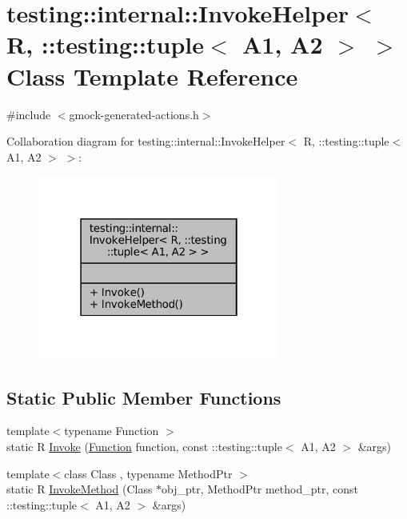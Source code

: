 \hypertarget{classtesting_1_1internal_1_1InvokeHelper_3_01R_00_01_1_1testing_1_1tuple_3_01A1_00_01A2_01_4_01_4}{}\section{testing\+:\+:internal\+:\+:Invoke\+Helper$<$ R, \+:\+:testing\+:\+:tuple$<$ A1, A2 $>$ $>$ Class Template Reference}
\label{classtesting_1_1internal_1_1InvokeHelper_3_01R_00_01_1_1testing_1_1tuple_3_01A1_00_01A2_01_4_01_4}


{\ttfamily \#include $<$gmock-\/generated-\/actions.\+h$>$}



Collaboration diagram for testing\+:\+:internal\+:\+:Invoke\+Helper$<$ R, \+:\+:testing\+:\+:tuple$<$ A1, A2 $>$ $>$\+:
\nopagebreak
\begin{figure}[H]
\begin{center}
\leavevmode
\includegraphics[width=226pt]{classtesting_1_1internal_1_1InvokeHelper_3_01R_00_01_1_1testing_1_1tuple_3_01A1_00_01A2_01_4_01_4__coll__graph}
\end{center}
\end{figure}
\subsection*{Static Public Member Functions}
\begin{DoxyCompactItemize}
\item 
{\footnotesize template$<$typename Function $>$ }\\static R \hyperlink{classtesting_1_1internal_1_1InvokeHelper_3_01R_00_01_1_1testing_1_1tuple_3_01A1_00_01A2_01_4_01_4_af3863b86ae4b7fbfd5a5f14e20b57423}{Invoke} (\hyperlink{structtesting_1_1internal_1_1Function}{Function} function, const \+::testing\+::tuple$<$ A1, A2 $>$ \&args)
\item 
{\footnotesize template$<$class Class , typename Method\+Ptr $>$ }\\static R \hyperlink{classtesting_1_1internal_1_1InvokeHelper_3_01R_00_01_1_1testing_1_1tuple_3_01A1_00_01A2_01_4_01_4_a227b8f07bfda13f6cb390655fc84f1ee}{Invoke\+Method} (Class $\ast$obj\+\_\+ptr, Method\+Ptr method\+\_\+ptr, const \+::testing\+::tuple$<$ A1, A2 $>$ \&args)
\end{DoxyCompactItemize}


